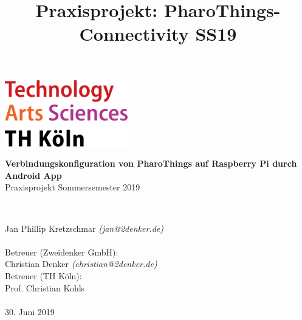 \documentclass[12pt,a4paper]{article}
\title{Praxisprojekt: PharoThings-Connectivity SS19}
\begin{document}
	\begin{titlepage}
    \includegraphics[width=0.4\textwidth]{th_logo.png}
    ~\\[2.5cm]
    \begin{center}
    \textbf{\huge Verbindungskonfiguration von PharoThings auf Raspberry Pi durch Android App}\\[0.5cm]
    {\Large Praxisprojekt Sommersemester 2019}
    \vfill
    \end{center}
    ~\\[2.0cm]
    \begin{flushright}
    {\large Jan Phillip Kretzschmar \it{(jan@2denker.de)}}\\[0.1cm]
    ~\\[1.0cm]
    {\large Betreuer (Zweidenker GmbH):}\\[0.1cm]
    {\large Christian Denker \it{(christian@2denker.de)}}
    ~\\[0.5cm]
    {\large Betreuer (TH Köln):}\\[0.1cm]
    {\large Prof. Christian Kohls}\\[0.1cm]

	~\\[1.0cm]
    {\large 30. Juni 2019}
	\end{flushright}
    \end{titlepage}
    \tableofcontents
    \pagebreak
    
    
    \pagebreak
    
    
\end{document}

